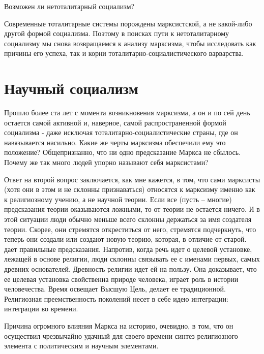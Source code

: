 \documentclass{book}
\begin{document}
Возможен ли нетоталитарный социализм?

Современные тоталитарные системы порождены марксистской, а не какой-либо другой формой социализма. Поэтому в поисках пути к нетоталитарному социализму мы снова возвращаемся к анализу марксизма, чтобы исследовать как причины его успеха, так и корни тоталитарно-социалистического варварства.


\section{Научный социализм}

Прошло более ста лет с момента возникновения марксизма, а он и по сей день остается самой активной и, наверное, самой распространенной формой социализма - даже исключая тота­литарно-социалистические страны, где он навязывается насиль­но. Какие же черты марксизма обеспечили ему это положение? Общепризнанно, что ни одно предсказание Маркса не сбылось. Почему же так много людей упорно называют себя маркси­стами?

Ответ на второй вопрос заключается, как мне кажется, в том, что сами марксисты (хотя они в этом и не склонны признаваться) относятся к марксизму именно как к религиозному учению,  а не научной теории. Если все (пусть -- многие) предсказания теории оказываются ложными, то от теории не остается ничего. И в этой ситуации люди обычно меньше всего склонны держаться за имя создателя теории. Скорее, они стремятся откреститься от него, стремятся подчеркнуть, что теперь они создали или создают новую  теорию, которая, в отличие от старой. дает правильные предсказания. Напротив, когда речь идет о целевой установке, лежащей в основе религии, люди склонны связывать ее с именами первых, самых древних основателей. Древность религии идет ей на пользу. Она доказывает, что ее целевая установка свойственна природе человека, играет роль в истории человечества. Время освещает Высшую Цель, делает ее традиционной. Религиозная преемственность поколений несет в себе идею интеграции: интеграции во времени.

Причина огромного влияния Маркса на историю, очевидно, в том, что он осуществил чрезвычайно удачный для своего вре­мени синтез религиозного элемента с политическим и научным элементами.
\end{document}
